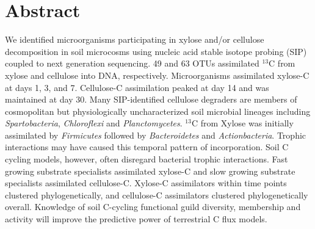 \section{Abstract} We identified microorganisms participating in xylose and/or
cellulose decomposition in soil microcosms using nucleic acid stable isotope
probing (SIP) coupled to next generation sequencing. 49 and 63
OTUs assimilated $^{13}$C from xylose and cellulose into DNA, respectively.
Microorganisms assimilated xylose-C at days 1, 3, and 7. Cellulose-C
assimilation peaked at day 14 and was maintained at day 30. Many SIP-identified
cellulose degraders are members of cosmopolitan but physiologically
uncharacterized soil microbial lineages including \textit{Spartobacteria},
\textit{Chloroflexi} and \textit{Planctomycetes}. $^{13}$C from Xylose was
initially assimilated by \textit{Firmicutes} followed by \textit{Bacteroidetes}
and \textit{Actionbacteria}. Trophic interactions may have caused this temporal
pattern of incorporation. Soil C cycling models, however, often disregard
bacterial trophic interactions. Fast growing substrate specialists assimilated
xylose-C and slow growing substrate specialists assimilated cellulose-C.
Xylose-C assimilators within time points clustered phylogenetically, and
cellulose-C assimilators clustered phylogenetically overall. Knowledge of soil
C-cycling functional guild diversity, membership and activity will improve the
predictive power of terrestrial C flux models. 
